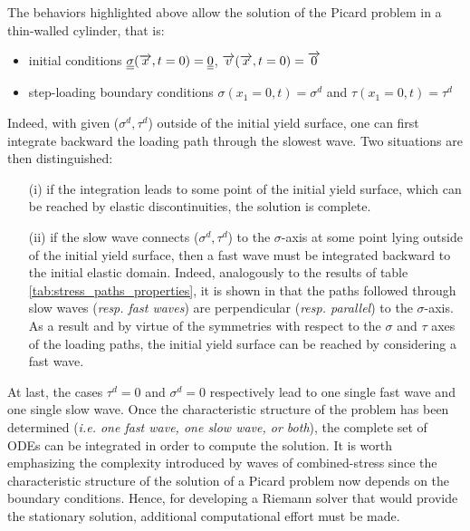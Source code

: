 The behaviors highlighted above allow the solution of the Picard problem in a thin-walled cylinder, that is:
\begin{itemize}
\item initial conditions ${\underline{\underline{\sigma}}}({\overrightarrow{x}},t=0)={\underline{\underline{0}}}$, ${\overrightarrow{v}}({\overrightarrow{x}},t=0)={\overrightarrow{0}}$
\item step-loading boundary conditions $\sigma(x_1=0,t)=\sigma^d$ and $\tau(x_1=0,t)=\tau^d$
\end{itemize}
Indeed, with given ($\sigma^d,\tau^d$) outside of the initial yield surface, one can first integrate backward the loading path through the slowest wave. Two situations are then distinguished:
\begin{itemize}
\item[(i)] if the integration leads to some point of the initial yield surface, which can be reached by elastic discontinuities, the solution is complete.
\item[(ii)] if the slow wave connects ($\sigma^d,\tau^d$) to the $\sigma$-axis at some point lying outside of the initial yield surface, then a fast wave must be integrated backward to the initial elastic domain.
  Indeed, analogously to the results of table \ref{tab:stress_paths_properties}, it is shown in \cite{Clifton} that the paths followed through slow waves (\textit{resp. fast waves}) are perpendicular (\textit{resp. parallel}) to the $\sigma$-axis. 
  As a result and by virtue of the symmetries with respect to the $\sigma$ and $\tau$ axes of the loading paths, the initial yield surface can be reached by considering a fast wave.  
\end{itemize}
At last, the cases $\tau^d=0$ and $\sigma^d=0$ respectively lead to one single fast wave and one single slow wave.
Once the characteristic structure of the problem has been determined (\textit{i.e. one fast wave, one slow wave, or both}), the complete set of ODEs can be integrated in order to compute the solution.
It is worth emphasizing the complexity introduced by waves of combined-stress since the characteristic structure of the solution of a Picard problem now depends on the boundary conditions.
Hence, for developing a Riemann solver that would provide the stationary solution, additional computational effort must be made.

